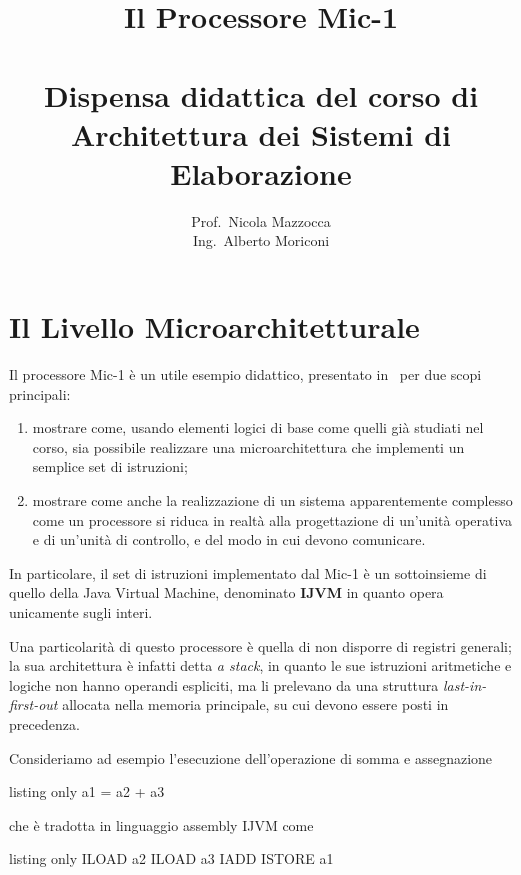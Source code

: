 \documentclass[a4paper,12pt]{scrreprt}
\title{Il Processore Mic-1 \\
  \ \\
  \large Dispensa didattica del corso di\\
  Architettura dei Sistemi di Elaborazione}
\author{Prof.\ Nicola Mazzocca \\
  Ing.\ Alberto Moriconi}
\date{}
\begin{document}
\maketitle

\chapter{Il Livello Microarchitetturale}

Il processore Mic-1 è un utile esempio didattico, presentato in~\cite{tanenbaum}
per due scopi principali:
\begin{enumerate}
  \item mostrare come, usando elementi logici di base come quelli già studiati
  nel corso, sia possibile realizzare una microarchitettura che implementi un
  semplice set di istruzioni;
  \item mostrare come anche la realizzazione di un sistema apparentemente
  complesso come un processore si riduca in realtà alla progettazione di
  un'unità operativa e di un'unità di controllo, e del modo in cui devono
  comunicare.
\end{enumerate}

In particolare, il set di istruzioni implementato dal Mic-1 è un sottoinsieme di
quello della Java Virtual Machine, denominato \textbf{IJVM} in quanto opera
unicamente sugli interi.

Una particolarità di questo processore è quella di non disporre di registri
generali; la sua architettura è infatti detta \textit{a stack}, in quanto le sue
istruzioni aritmetiche e logiche non hanno operandi espliciti, ma li prelevano
da una struttura \textit{last-in-first-out} allocata nella memoria principale,
su cui devono essere posti in precedenza.

\medskip

Consideriamo ad esempio l'esecuzione dell'operazione di somma e assegnazione

\begin{tcblisting}{listing only}
  a1 = a2 + a3
\end{tcblisting}

che è tradotta in linguaggio assembly IJVM come

\begin{tcblisting}{listing only}
  ILOAD a2
  ILOAD a3
  IADD
  ISTORE a1
\end{tcblisting}
\end{document}
